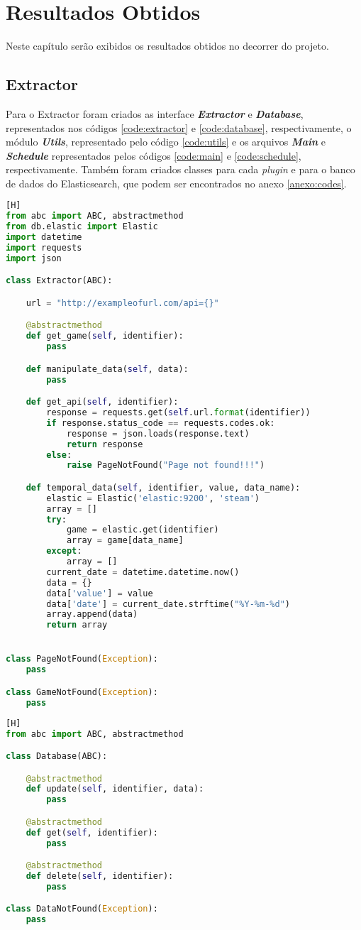 \chapter[Resultados Obtidos]{Resultados Obtidos}
Neste capítulo serão exibidos os resultados obtidos no decorrer do projeto.

\section{Extractor}
Para o Extractor foram criados as interface \textit{\textbf{Extractor}} e \textit{\textbf{Database}}, representados nos códigos \ref{code:extractor} e \ref{code:database}, respectivamente, o módulo \textit{\textbf{Utils}}, representado pelo código \ref{code:utils} e os arquivos \textit{\textbf{Main}} e \textit{\textbf{Schedule}} representados pelos códigos \ref{code:main} e \ref{code:schedule}, respectivamente. Também foram criados classes para cada \textit{plugin} e para o banco de dados do Elasticsearch, que podem ser encontrados no anexo \ref{anexo:codes}.
\begin{lstlisting}[language={Python}, caption = {Código do \textit{\textbf{Extractor}}}, label = {code:extractor}] [H]
from abc import ABC, abstractmethod
from db.elastic import Elastic
import datetime
import requests
import json

class Extractor(ABC):

	url = "http://exampleofurl.com/api={}"

	@abstractmethod
	def get_game(self, identifier):
		pass

	def manipulate_data(self, data):
		pass

	def get_api(self, identifier):
		response = requests.get(self.url.format(identifier))
		if response.status_code == requests.codes.ok:
			response = json.loads(response.text)
			return response
		else:
			raise PageNotFound("Page not found!!!")

	def temporal_data(self, identifier, value, data_name):
		elastic = Elastic('elastic:9200', 'steam')
		array = []
		try:
			game = elastic.get(identifier)
			array = game[data_name]
		except:
			array = []
		current_date = datetime.datetime.now()
		data = {}
		data['value'] = value
		data['date'] = current_date.strftime("%Y-%m-%d")
		array.append(data)
		return array


class PageNotFound(Exception):
	pass

class GameNotFound(Exception):
	pass
\end{lstlisting}
\begin{lstlisting}[language={Python}, caption = {Código do \textit{\textbf{Database}}}, label = {code:database}] [H]
from abc import ABC, abstractmethod

class Database(ABC):

	@abstractmethod
	def update(self, identifier, data):
		pass

	@abstractmethod
	def get(self, identifier):
		pass

	@abstractmethod
	def delete(self, identifier):
		pass

class DataNotFound(Exception):
	pass
\end{lstlisting}

